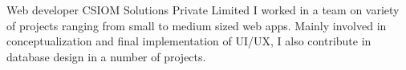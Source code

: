     {Web developer}
    {}
    {CSIOM Solutions Private Limited}
    {}
    {I worked in a team on variety of projects ranging from small to medium sized web apps. Mainly involved in conceptualization and final implementation of UI/UX, I also contribute in database design in a number of projects.
    }
    \vspace*{0.2\baselineskip}
